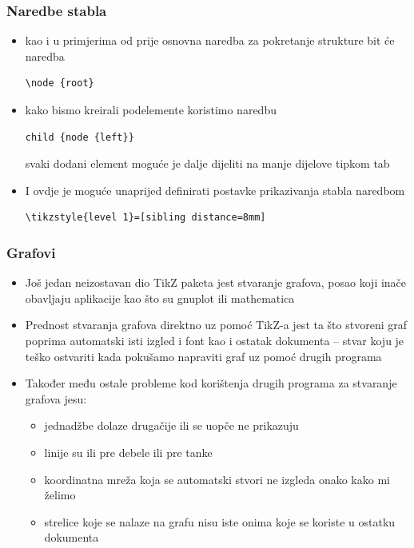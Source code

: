 \documentclass{beamer}
\begin{document}
\begin{frame}[fragile]
	\frametitle{Naredbe stabla}
		\begin{itemize}
		\item kao i u primjerima od prije osnovna naredba za pokretanje strukture bit će naredba\begin{verbatim}\node {root}\end{verbatim}
		\item kako bismo kreirali podelemente koristimo naredbu 
		\begin{verbatim}child {node {left}}\end{verbatim} svaki dodani element moguće je dalje dijeliti na manje dijelove tipkom tab
		\item I ovdje je moguće unaprijed definirati postavke prikazivanja stabla naredbom
		\begin{verbatim}\tikzstyle{level 1}=[sibling distance=8mm]\end{verbatim}
		\end{itemize}	
\end{frame}	

	\begin{frame}
	\frametitle{Grafovi}
		\begin{itemize}
			\item Još jedan neizostavan dio TikZ paketa jest stvaranje grafova, posao koji inače obavljaju aplikacije kao što su gnuplot ili mathematica
			\item Prednost stvaranja grafova direktno uz pomoć TikZ-a jest ta što stvoreni graf poprima automatski isti izgled i font kao i ostatak dokumenta – stvar koju je teško ostvariti kada pokušamo napraviti graf uz pomoć drugih programa
			\item Također među ostale probleme kod korištenja drugih programa za stvaranje grafova jesu:
			\begin{itemize}
			\item jednadžbe dolaze drugačije ili se uopče ne prikazuju
			\item linije su ili pre debele ili pre tanke
			\item koordinatna mreža koja se automatski stvori ne izgleda onako kako mi želimo
			\item strelice koje se nalaze na grafu nisu iste onima koje se koriste u ostatku dokumenta
			\end{itemize}	
		\end{itemize}
	\end{frame}
\end{document}
